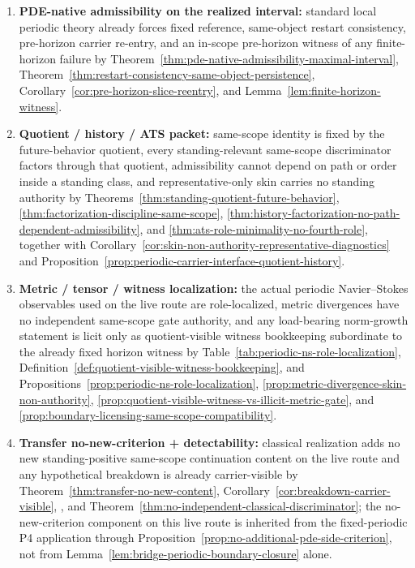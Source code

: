 \begin{tcolorbox}[breakable, title={Compressed proof spine for the official theorem}, colback=blue!2!white, colframe=blue!55!black, boxsep=1pt, left=2pt, right=2pt, top=2pt, bottom=2pt]
\begin{enumerate}[label=(\roman*), leftmargin=2.2em, itemsep=0.15em, topsep=0.15em]
\item \textbf{PDE-native admissibility on the realized interval:} standard local periodic theory already forces fixed reference, same-object restart consistency, pre-horizon carrier re-entry, and an in-scope pre-horizon witness of any finite-horizon failure by Theorem~\ref{thm:pde-native-admissibility-maximal-interval}, Theorem~\ref{thm:restart-consistency-same-object-persistence}, Corollary~\ref{cor:pre-horizon-slice-reentry}, and Lemma~\ref{lem:finite-horizon-witness}.
\item \textbf{Quotient / history / ATS packet:} same-scope identity is fixed by the future-behavior quotient, every standing-relevant same-scope discriminator factors through that quotient, admissibility cannot depend on path or order inside a standing class, and representative-only skin carries no standing authority by Theorems~\ref{thm:standing-quotient-future-behavior}, \ref{thm:factorization-discipline-same-scope}, \ref{thm:history-factorization-no-path-dependent-admissibility}, and \ref{thm:ats-role-minimality-no-fourth-role}, together with Corollary~\ref{cor:skin-non-authority-representative-diagnostics} and Proposition~\ref{prop:periodic-carrier-interface-quotient-history}.
\item \textbf{Metric / tensor / witness localization:} the actual periodic Navier--Stokes observables used on the live route are role-localized, metric divergences have no independent same-scope gate authority, and any load-bearing norm-growth statement is licit only as quotient-visible witness bookkeeping subordinate to the already fixed horizon witness by Table~\ref{tab:periodic-ns-role-localization}, Definition~\ref{def:quotient-visible-witness-bookkeeping}, and Propositions~\ref{prop:periodic-ns-role-localization}, \ref{prop:metric-divergence-skin-non-authority}, \ref{prop:quotient-visible-witness-vs-illicit-metric-gate}, and \ref{prop:boundary-licensing-same-scope-compatibility}.
\item \textbf{Transfer no-new-criterion + detectability:} classical realization adds no new standing-positive same-scope continuation content on the live route and any hypothetical breakdown is already carrier-visible by Theorem~\ref{thm:transfer-no-new-content}, Corollary~\ref{cor:breakdown-carrier-visible}, \HorizonDetectabilityRef{}, and Theorem~\ref{thm:no-independent-classical-discriminator}; the no-new-criterion component on this live route is inherited from the fixed-periodic P4 application through Proposition~\ref{prop:no-additional-pde-side-criterion}, not from Lemma~\ref{lem:bridge-periodic-boundary-closure} alone.

\end{enumerate}
\end{tcolorbox}
